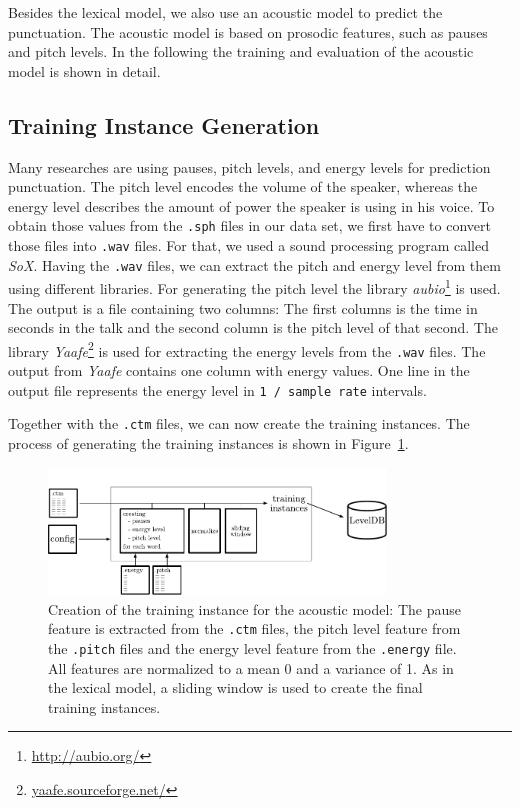 Besides the lexical model, we also use an acoustic model to predict the punctuation.
The acoustic model is based on prosodic features, such as pauses and pitch levels.
In the following the training and evaluation of the acoustic model is shown in detail.

\subsection{Training Instance Generation}

Many researches are using pauses, pitch levels, and energy levels for prediction punctuation.
The pitch level encodes the volume of the speaker, whereas the energy level describes the amount of power the speaker is using in his voice.
To obtain those values from the \texttt{.sph} files in our data set, we first have to convert those files into \texttt{.wav} files.
For that, we used a sound processing program called \emph{SoX}.
Having the \texttt{.wav} files, we can extract the pitch and energy level from them using different libraries.
For generating the pitch level the library \emph{aubio}\footnote{\url{http://aubio.org/}} is used.
The output is a file containing two columns: The first columns is the time in seconds in the talk and the second column is the pitch level of that second.
The library \emph{Yaafe}\footnote{\url{yaafe.sourceforge.net/}} is used for extracting the energy levels from the \texttt{.wav} files.
The output from \emph{Yaafe} contains one column with energy values.
One line in the output file represents the energy level in \texttt{1 / sample rate} intervals.

Together with the \texttt{.ctm} files, we can now create the training instances.
The process of generating the training instances is shown in Figure~\ref{fig:overview_acoustic}.
\begin{figure}[ht]
    \centering
    \includegraphics[width=0.8\textwidth]{img/overview_accoustic.pdf}
    \caption{Creation of the training instance for the acoustic model: The pause feature is extracted from the \texttt{.ctm} files, the pitch level feature from the \texttt{.pitch} files and the energy level feature from the \texttt{.energy} file. All features are normalized to a mean 0 and a variance of 1. As in the lexical model, a sliding window is used to create the final training instances.}
    \label{fig:overview_acoustic}
\end{figure}

